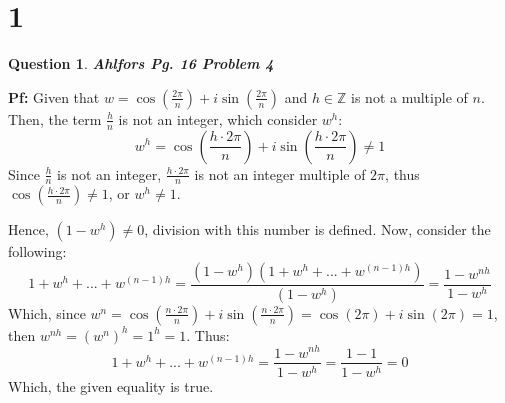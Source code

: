 \documentclass{article}
\newtheorem{question}{Question}
\begin{document}
\begin{comment}
\break

\section*{3}
\begin{question}
    \textbf{Ahlfors Pg. 11 Problem 3
    }
\end{question}

\textbf{Pf:}

Given that $|a_i|<1,\ \lambda_i \geq 0$ for all $i = 1,...,n$, and $\lambda_1 + ...+\lambda_n=1$. By the Triangle Inequality:
$$|\lambda_1a_1 + ... + \lambda_na_n| \leq |\lambda_1a_1|+...+|\lambda_na_n| = \lambda_1|a_1|+...+\lambda_n|a_n|$$
(Note: above is true since each coefficient $\lambda_i \geq 0$).
Then, let $M = \max\{|a_1|,...,|a_n|\}$, which for all $i\in\{1,...,n\}$, $|a_i|\leq M$; and since $|a_i| <1$ for all index $i$, $M <1$.
Thus, the following is true:
$$\lambda_1|a_1|+...+\lambda_n|a_n| \leq \lambda_1\cdot M + ... +\lambda_n\cdot M = M(\lambda_1+...+\lambda_n) = M$$
Which, combining all the inequalities above, we get:
$$|\lambda_1a_1 + ... + \lambda_na_n| \leq \lambda_1|a_1|+...+\lambda_n|a_n| \leq M <1$$
$$|\lambda_1a_1 + ... + \lambda_na_n| <1$$
Which, the given inequality is true.

\hfill

\end{comment}

\section*{1}
\begin{question}
    \textbf{Ahlfors Pg. 16 Problem 4
    }
\end{question}

\textbf{Pf:}
Given that $w = \cos(\frac{2\pi}{n})+i\sin(\frac{2\pi}{n})$ and $h\in\mathbb{Z}$ is not a multiple of $n$. 
Then, the term $\frac{h}{n}$ is not an integer, which consider $w^h$:
$$w^h = \cos\left(\frac{h\cdot 2\pi}{n}\right)+i\sin\left(\frac{h\cdot 2\pi}{n}\right) \neq 1$$
Since $\frac{h}{n}$ is not an integer, $\frac{h\cdot 2\pi}{n}$ is not an integer multiple of $2\pi$, thus $\cos\left(\frac{h\cdot 2\pi}{n}\right)\neq 1$, or $w^h \neq 1$.

Hence, $(1-w^h) \neq 0$, division with this number is defined. Now, consider the following:
$$1+w^h+...+w^{(n-1)h} = \frac{(1-w^h)(1+w^h+...+w^{(n-1)h})}{(1-w^h)} = \frac{1-w^{nh}}{1-w^h}$$
Which, since $w^n = \cos(\frac{n\cdot 2\pi}{n})+i\sin(\frac{n\cdot 2\pi}{n}) = \cos(2\pi)+i\sin(2\pi) = 1$, then $w^{nh} = (w^n)^h = 1^h = 1$. Thus:
$$1+w^h+...+w^{(n-1)h} = \frac{1-w^{nh}}{1-w^h} = \frac{1-1}{1-w^h}=0$$
Which, the given equality is true.
\end{document}
